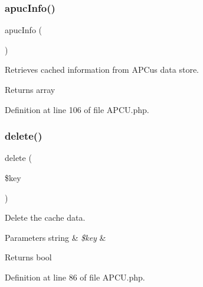\mbox{\label{class_zest_1_1_cache_1_1_a_p_c_u_1_1_a_p_c_u_a60ad85517f8c59f4fa351ecbfde3a3f5}} 
\subsubsection{\texorpdfstring{apuc\+Info()}{apucInfo()}}
{\footnotesize\ttfamily apuc\+Info (\begin{DoxyParamCaption}{ }\end{DoxyParamCaption})}

Retrieves cached information from A\+P\+Cu\textquotesingle{}s data store.

\begin{DoxyReturn}{Returns}
array 
\end{DoxyReturn}


Definition at line 106 of file A\+P\+C\+U.\+php.

\mbox{\label{class_zest_1_1_cache_1_1_a_p_c_u_1_1_a_p_c_u_aa74a2edd6f3cbb5c5353f7faa97b6d70}} 
\subsubsection{\texorpdfstring{delete()}{delete()}}
{\footnotesize\ttfamily delete (\begin{DoxyParamCaption}\item[{}]{\$key }\end{DoxyParamCaption})}

Delete the cache data.


\begin{DoxyParams}[1]{Parameters}
string & {\em \$key} & \\
\hline
\end{DoxyParams}
\begin{DoxyReturn}{Returns}
bool 
\end{DoxyReturn}


Definition at line 86 of file A\+P\+C\+U.\+php.

